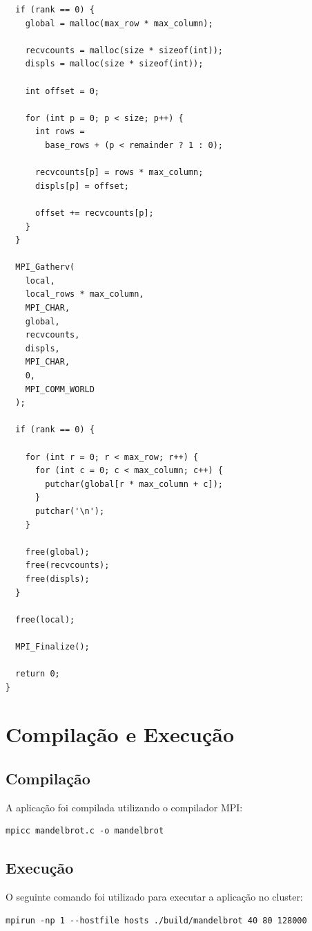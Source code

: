 \documentclass[
    12pt,
    oneside,
    a4paper,
    brazil
]{abntex2}
\begin{document}
\begin{verbatim}
  if (rank == 0) {
    global = malloc(max_row * max_column);

    recvcounts = malloc(size * sizeof(int));
    displs = malloc(size * sizeof(int));

    int offset = 0;

    for (int p = 0; p < size; p++) {
      int rows =
        base_rows + (p < remainder ? 1 : 0);

      recvcounts[p] = rows * max_column;
      displs[p] = offset;

      offset += recvcounts[p];
    }
  }

  MPI_Gatherv(
    local,
    local_rows * max_column,
    MPI_CHAR,
    global,
    recvcounts,
    displs,
    MPI_CHAR,
    0,
    MPI_COMM_WORLD
  );

  if (rank == 0) {

    for (int r = 0; r < max_row; r++) {
      for (int c = 0; c < max_column; c++) {
        putchar(global[r * max_column + c]);
      }
      putchar('\n');
    }

    free(global);
    free(recvcounts);
    free(displs);
  }

  free(local);

  MPI_Finalize();

  return 0;
}
\end{verbatim}

\normalsize

\chapter{Compilação e Execução}

\section{Compilação}

A aplicação foi compilada utilizando o compilador MPI:

\begin{verbatim}
mpicc mandelbrot.c -o mandelbrot
\end{verbatim}

\section{Execução}

O seguinte comando foi utilizado para executar a aplicação no cluster:

\begin{verbatim}
mpirun -np 1 --hostfile hosts ./build/mandelbrot 40 80 128000
\end{verbatim}
\end{document}

